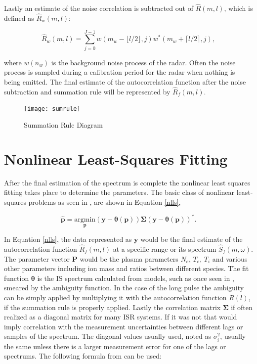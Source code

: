 \documentclass[10pt]{report}
\begin{document}
Lastly an estimate of the noise correlation is subtracted out of $\hat{R}(m,l)$, which is defined as $\hat{R}_w(m,l)$:

\begin{equation}
\label{lagpro}
\hat{R}_w(m,l) = \displaystyle\sum\limits_{j=0}^{J-1} w(m_w-\lfloor l/2\rfloor,j)w^*(m_w+\lceil l/2 \rceil,j),
\end{equation}

\noindent where $w(n_w)$ is the background noise process of the radar.  Often the noise process is sampled during a calibration period for the radar when nothing is being emitted.  The final estimate of the autocorrelation function after the noise subtraction and summation rule will be represented by $\hat{R}_f(m,l)$.
\begin{figure}[!t]
\centering
\texttt{[image: sumrule]}
\caption{Summation Rule Diagram}
\label{fig:sumrule}
\end{figure}

\section{Nonlinear Least-Squares Fitting}
After the final estimation of the spectrum is complete the nonlinear least squares fitting takes place to determine the parameters.  The basic class of nonlinear least-squares problems as seen in \cite{kayvol1}, are shown in Equation \ref{nlls},

\begin{equation}
	\hat{\mathbf{p}}= \underset{\mathbf{p}}{\text{argmin}} (\mathbf{y}-\bm{\theta}(\mathbf{p}))\bm{\Sigma}(\mathbf{y}-\bm{\theta}(\mathbf{p}))^*.
\label{nlls}
\end{equation}

In Equation \ref{nlls}, the data represented as $\mathbf{y}$ would be the final estimate of the autocorrelation function $\hat{R}_f(m,l)$ at a specific range or its spectrum $\hat{S}_f(m,\omega)$.  The parameter vector $\mathbf{P}$ would be the plasma parameters $N_e$, $T_e$, $T_i$ and various other parameters including ion mass and ratios between different species.  The fit function $\bm{\theta}$ is the IS spectrum calculated from models, such as once seen in \cite{kudeki:milla:1}, smeared by the ambiguity function.  In the case of the long pulse the ambiguity can be simply applied by multiplying it with the autocorrelation function $R(l)$, if the summation rule is properly applied.  Lastly the correlation matrix $\bm{\Sigma}$ if often realized as a diagonal matrix for many ISR systems.  If it was not that would imply correlation with the measurement uncertainties between different lags or samples of the spectrum.  The diagonal values usually used, noted as $\sigma_i^2$, usually the same unless there is a larger measurement error for one of the lags or spectrums.  The following formula from  \cite{nicollsisrschool2013} can be used:
\end{document}
